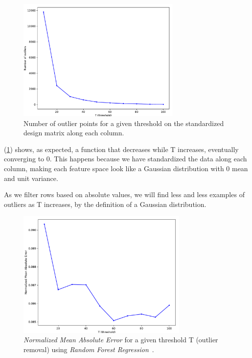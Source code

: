 \documentclass[]{article}
\begin{document}
\begin{figure}[h!]
    \centering
    \captionsetup{justification=centering}
    \includegraphics[width=0.72\textwidth,height=\textheight,keepaspectratio]{../result/project1/number_outliers.pdf}
    \caption{Number of outlier points for a given threshold on the standardized design matrix along each column.}
    \label{fig:3}
\end{figure}

(\ref{fig:3}) shows, as expected, a function that decreases while T increases, eventually converging to 0. This happens because we have standardized the data along each column, making each feature space look like a Gaussian distribution with 0 mean and unit variance.

As we filter rows based on absolute values, we will find less and less examples of outliers as T increases, by the definition of a Gaussian distribution.

\pagebreak

\begin{figure}[h!]
    \centering
    \captionsetup{justification=centering}
    \includegraphics[width=0.75\textwidth,height=\textheight,keepaspectratio]{../result/project1/nmae_outliers.pdf}
    \caption{\textit{Normalized Mean Absolute Error} for a given threshold T (outlier removal) using \textit{Random Forest Regression}~\cite{RFR}.}
    \label{fig:4}
\end{figure}
\end{document}
